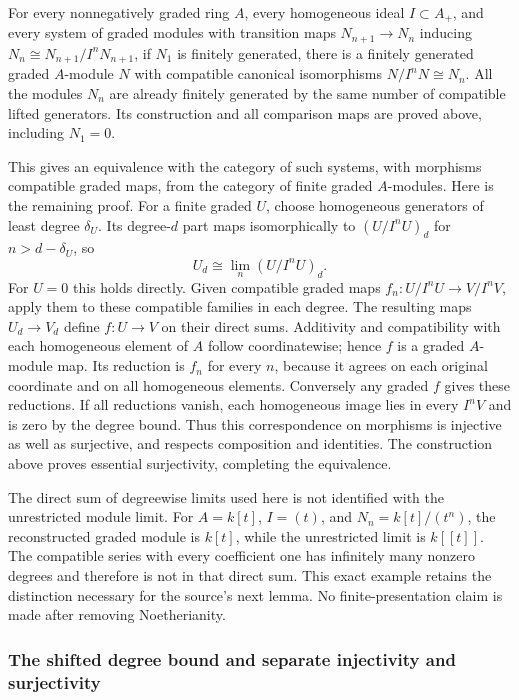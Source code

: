 For every nonnegatively graded ring \(A\), every homogeneous ideal \(I\subset A_+\), and every system of graded modules with transition maps \(N_{n+1}\to N_n\) inducing \(N_n\cong N_{n+1}/I^nN_{n+1}\), if \(N_1\) is finitely generated, there is a finitely generated graded \(A\)-module \(N\) with compatible canonical isomorphisms \(N/I^nN\cong N_n\). All the modules \(N_n\) are already finitely generated by the same number of compatible lifted generators. Its construction and all comparison maps are proved above, including \(N_1=0\).

This gives an equivalence with the category of such systems, with morphisms compatible graded maps, from the category of finite graded \(A\)-modules. Here is the remaining proof. For a finite graded \(U\), choose homogeneous generators of least degree \(\delta_U\). Its degree-\(d\) part maps isomorphically to \((U/I^nU)_d\) for \(n>d-\delta_U\), so \[
U_d\cong\lim_n(U/I^nU)_d .
\] For \(U=0\) this holds directly. Given compatible graded maps \(f_n:U/I^nU\to V/I^nV\), apply them to these compatible families in each degree. The resulting maps \(U_d\to V_d\) define \(f:U\to V\) on their direct sums. Additivity and compatibility with each homogeneous element of \(A\) follow coordinatewise; hence \(f\) is a graded \(A\)-module map. Its reduction is \(f_n\) for every \(n\), because it agrees on each original coordinate and on all homogeneous elements. Conversely any graded \(f\) gives these reductions. If all reductions vanish, each homogeneous image lies in every \(I^nV\) and is zero by the degree bound. Thus this correspondence on morphisms is injective as well as surjective, and respects composition and identities. The construction above proves essential surjectivity, completing the equivalence.

The direct sum of degreewise limits used here is not identified with the unrestricted module limit. For \(A=k[t]\), \(I=(t)\), and \(N_n=k[t]/(t^n)\), the reconstructed graded module is \(k[t]\), while the unrestricted limit is \(k[[t]]\). The compatible series with every coefficient one has infinitely many nonzero degrees and therefore is not in that direct sum. This exact example retains the distinction necessary for the source's next lemma. No finite-presentation claim is made after removing Noetherianity.

\subsubsection{The shifted degree bound and separate injectivity and surjectivity}\label{algebra-proof-015-the-shifted-degree-bound-and-separate-injectivity-and-surjectivity}

